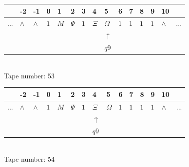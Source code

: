 \documentclass[11pt]{article}
\begin{document}
\begin{table}[H]
\centering
\begin{tabular}{lllllllllllllll}
 & -2 & -1 & 0 & 1 & 2 & 3 & 4 & 5 & 6 & 7 & 8 & 9 & 10 & \\
\hline
$...$ & \multicolumn{1}{|l|}{$\wedge$} & \multicolumn{1}{|l|}{$\wedge$} & \multicolumn{1}{|l|}{$1$} & \multicolumn{1}{|l|}{$M$} & \multicolumn{1}{|l|}{$\Psi$} & \multicolumn{1}{|l|}{$1$} & \multicolumn{1}{|l|}{$\Xi$} & \multicolumn{1}{|l|}{$\Omega$} & \multicolumn{1}{|l|}{$1$} & \multicolumn{1}{|l|}{$1$} & \multicolumn{1}{|l|}{$1$} & \multicolumn{1}{|l|}{$1$} & \multicolumn{1}{|l|}{$\wedge$} & $...$\\
\hline
&  &  &  &  &  &  &  & $\uparrow$ &  &  &  &  &  &  \\
&  &  &  &  &  &  &  & $ q9 $ &  &  &  &  &  &  \\
\end{tabular}
\\
Tape number: 53
\noindent\makebox[\linewidth]{\hdashrule{\textwidth}{1pt}{1pt}}\end{table}
\clearpage

\begin{table}[H]
\centering
\begin{tabular}{lllllllllllllll}
 & -2 & -1 & 0 & 1 & 2 & 3 & 4 & 5 & 6 & 7 & 8 & 9 & 10 & \\
\hline
$...$ & \multicolumn{1}{|l|}{$\wedge$} & \multicolumn{1}{|l|}{$\wedge$} & \multicolumn{1}{|l|}{$1$} & \multicolumn{1}{|l|}{$M$} & \multicolumn{1}{|l|}{$\Psi$} & \multicolumn{1}{|l|}{$1$} & \multicolumn{1}{|l|}{$\Xi$} & \multicolumn{1}{|l|}{$\Omega$} & \multicolumn{1}{|l|}{$1$} & \multicolumn{1}{|l|}{$1$} & \multicolumn{1}{|l|}{$1$} & \multicolumn{1}{|l|}{$1$} & \multicolumn{1}{|l|}{$\wedge$} & $...$\\
\hline
&  &  &  &  &  &  & $\uparrow$ &  &  &  &  &  &  &  \\
&  &  &  &  &  &  & $ q9 $ &  &  &  &  &  &  &  \\
\end{tabular}
\\
Tape number: 54
\noindent\makebox[\linewidth]{\hdashrule{\textwidth}{1pt}{1pt}}\end{table}
\end{document}
